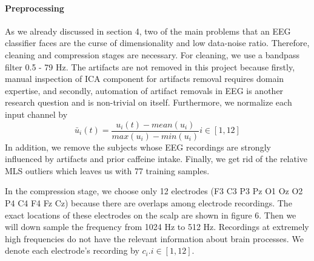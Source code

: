 \documentclass[a4paper,11pt,oneside]{article}
\begin{document}
	\paragraph{Preprocessing} As we already discussed in section 4, two of the main problems that an EEG classifier faces are the curse of dimensionality and low data-noise ratio. Therefore, cleaning and compression stages are necessary. For cleaning, we use a bandpass filter 0.5 - 79 Hz. The artifacts are not removed in this project because firstly, manual inspection of ICA component for artifacts removal requires domain expertise, and secondly, automation of artifact removals in EEG is another research question and is non-trivial on itself. Furthermore, we normalize each input channel by 
	$$ \bar{u}_i(t) = \frac{u_i(t) - mean(u_i)}{max(u_i) - min(u_i)} i \in [1, 12] $$
	   In addition, we remove the subjects whose EEG recordings are strongly influenced by artifacts and prior caffeine intake. Finally, we get rid of the relative MLS outliers which leaves us with 77 training samples.
		
	In the compression stage, we choose only 12 electrodes (F3 C3 P3 Pz O1 Oz O2 P4 C4 F4 Fz Cz) because  there are overlaps among electrode recordings. The exact locations of these electrodes on the scalp are shown in figure 6. Then we will down sample the frequency from 1024 Hz to 512 Hz. Recordings at extremely high frequencies do not have the relevant information about brain processes. We denote each electrode's recording by $c_i. i \in [1, 12]$. 
	
\end{document}
